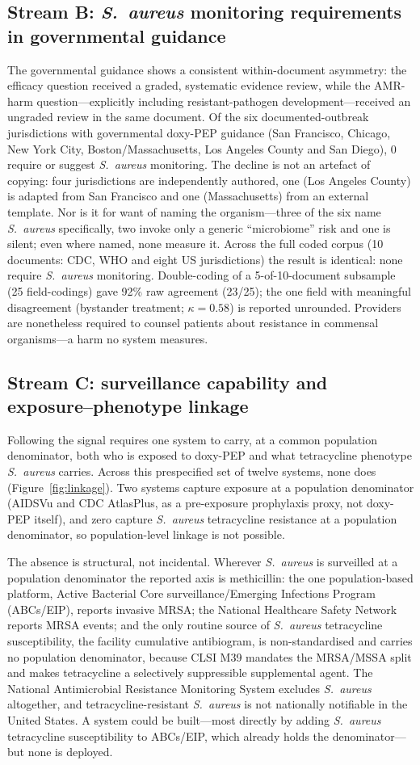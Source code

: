 \documentclass[12pt,a4paper]{article}
\newcommand{\sa}{\emph{S.~aureus}}
\begin{document}
\subsection*{Stream B: \sa{} monitoring requirements in governmental guidance}
The governmental guidance shows a consistent within-document asymmetry: the
efficacy question received a graded, systematic evidence review, while the
AMR-harm question---explicitly including resistant-pathogen development---received
an ungraded review in the same document. Of the six documented-outbreak
jurisdictions with governmental doxy-PEP guidance (San Francisco, Chicago, New
York City, Boston/Massachusetts, Los Angeles County and San Diego), 0 require or
suggest \sa{} monitoring. The decline is not an artefact of copying: four
jurisdictions are independently authored, one (Los Angeles County) is adapted
from San Francisco and one (Massachusetts) from an external template. Nor is it
for want of naming the organism---three of the six name \sa{} specifically, two
invoke only a generic ``microbiome'' risk and one is silent; even where named,
none measure it. Across the full coded corpus (10 documents: CDC, WHO and eight
US jurisdictions) the result is identical: none require \sa{} monitoring.
Double-coding of a 5-of-10-document subsample (25 field-codings) gave 92\% raw
agreement (23/25); the one field with meaningful disagreement (bystander treatment;
$\kappa=0.58$) is reported unrounded. Providers are nonetheless required to counsel
patients about resistance in commensal organisms---a harm no system measures.

\subsection*{Stream C: surveillance capability and exposure--phenotype linkage}
Following the signal requires one system to carry, at a common population
denominator, both who is exposed to doxy-PEP and what tetracycline phenotype \sa{}
carries. Across this prespecified set of twelve systems, none does
(Figure~\ref{fig:linkage}). Two systems capture exposure at a population
denominator (AIDSVu and CDC AtlasPlus, as a pre-exposure prophylaxis proxy, not
doxy-PEP itself),\cite{aidsvu} and zero capture \sa{} tetracycline resistance at a
population denominator, so population-level linkage is not possible.

The absence is structural, not incidental. Wherever \sa{} is surveilled at a population
denominator the reported axis is methicillin: the one population-based platform,
Active Bacterial Core surveillance/Emerging Infections Program (ABCs/EIP),
reports invasive MRSA; the National Healthcare Safety Network reports MRSA events;
and the only routine source of \sa{} tetracycline susceptibility, the facility
cumulative antibiogram, is non-standardised and carries no population
denominator, because CLSI M39 mandates the MRSA/MSSA split and makes tetracycline
a selectively suppressible supplemental agent. The National Antimicrobial
Resistance Monitoring System excludes \sa{} altogether, and tetracycline-resistant
\sa{} is not nationally notifiable in the United States. A system could be built---most directly by
adding \sa{} tetracycline susceptibility to ABCs/EIP, which already holds the
denominator---but none is deployed.
\end{document}

